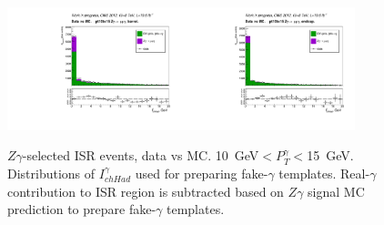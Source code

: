 \begin{figure}[htb]
  \begin{center}
   \includegraphics[width=0.45\textwidth]{../figs/figs_v11/MUON_ZGamma/PrepareYields/c_TotalDATAvsMC_Barrel__phoPFChIsoCorrFSR_EXCLUDED_pt10to15_.pdf}\includegraphics[width=0.45\textwidth]{../figs/figs_v11/MUON_ZGamma/PrepareYields/c_TotalDATAvsMC_Endcap__phoPFChIsoCorrFSR_EXCLUDED_pt10to15_.pdf}\\
  \caption{$Z\gamma$-selected ISR events, data vs MC. 10~GeV$<P_T^{\gamma}<$15~GeV. Distributions of $I_{chHad}^{\gamma}$ used for preparing fake-$\gamma$ templates. Real-$\gamma$ contribution to ISR region is subtracted based on $Z\gamma$ signal MC prediction to prepare fake-$\gamma$ templates.}
  \label{fig:Zg_ISR_phoPFChIsoCorr_pt10to15}
  \end{center}
\end{figure}

